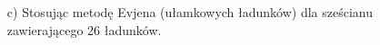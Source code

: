 \documentclass[a4paper,11pt]{article}
\begin{document}
\begin{enumerate}
\begin{itemize}
  \item[c)] Stosując metodę Evjena (ułamkowych ładunków) dla sześcianu
    zawierającego 26 ładunków.

  \end{itemize}



















\end{enumerate}
\end{document}
